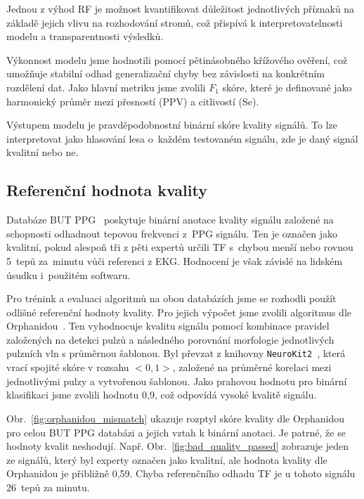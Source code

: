 Jednou z výhod \acs{RF} je možnost kvantifikovat důležitost jednotlivých příznaků na základě jejich vlivu na rozhodování stromů, což přispívá k interpretovatelnosti modelu a transparentnosti výsledků.

Výkonnost modelu jsme hodnotili pomocí pětinásobného křížového ověření, což umožňuje stabilní odhad generalizační chyby bez závislosti na konkrétním rozdělení dat.
Jako hlavní metriku jsme zvolili $F_1$ skóre, které je definované jako harmonický průměr mezi přesností (\acs{PPV}) a citlivostí (\acs{Se}).

Výstupem modelu je pravděpodobnostní binární skóre kvality signálů.
To lze interpretovat jako hlasování lesa o~každém testovaném signálu, zde je daný signál kvalitní nebo ne.

\subsection*{Referenční hodnota kvality}
\label{subsec:referencni_hodnota_kvality}
Databáze \acs{BUT PPG}~\cite{BUT_PPG,BUT_PPG_database} poskytuje binární anotace kvality signálu založené na schopnosti odhadnout tepovou frekvenci z~\acs{PPG} signálu.
Ten je označen jako kvalitní, pokud alespoň tři z pěti expertů určili \acs{TF} s~chybou menší nebo rovnou 5~tepů za~minutu vůči referenci z \acs{EKG}.
Hodnocení je však závislé na lidském úsudku i~použitém softwaru.

Pro trénink a evaluaci algoritmů na obou databázích jsme se rozhodli použít odlišné referenční hodnoty kvality.
Pro jejich výpočet jsme zvolili algoritmus dle Orphanidou~\cite{Orphanidou2015,NeuroKit2}.
Ten vyhodnocuje kvalitu signálu pomocí kombinace pravidel založených na detekci pulzů a následného porovnání morfologie jednotlivých pulzních vln s průměrnou šablonou.
Byl převzat z knihovny \texttt{NeuroKit2}~\cite{NeuroKit2}, která vrací spojité skóre v rozsahu $<0, 1>$, založené na průměrné korelaci mezi jednotlivými pulzy a vytvořenou šablonou.
Jako prahovou hodnotu pro binární klasifikaci jsme zvolili hodnotu 0,9, což odpovídá vysoké kvalitě signálu.

Obr.~\ref{fig:orphanidou_mismatch} ukazuje rozptyl skóre kvality dle Orphanidou pro celou \acs{BUT PPG} databázi a jejich vztah k binární anotaci.
Je patrné, že se hodnoty kvalit neshodují.
Např. Obr.~\ref{fig:bad_quality_passed} zobrazuje jeden ze signálů, který byl experty označen jako kvalitní, ale hodnota kvality dle Orphanidou je přibližně 0,59.
Chyba referenčního odhadu \acs{TF} je u tohoto signálu 26~tepů za minutu.


